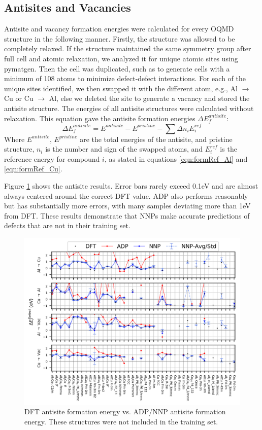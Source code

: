 \documentclass{article}
\begin{document}
\subsection{Antisites and Vacancies} \label{sct:antsite_results}
Antisite and vacancy formation energies were calculated for every OQMD structure in the following manner.
Firstly, the structure was allowed to be completely relaxed.
If the structure maintained the same symmetry group after full cell and atomic relaxation, we analyzed it for unique atomic sites using pymatgen.
Then the cell was duplicated, such as to generate cells with a minimum of 108 atoms to minimize defect-defect interactions.
For each of the unique sites identified, we then swapped it with the different atom, e.g., Al $\rightarrow$ Cu or Cu $\rightarrow$ Al, else we deleted the site to generate a vacancy and stored the antisite structure.
The energies of all antisite structures were calculated without relaxation.
This equation gave the antisite formation energies $\Delta E^{antisite}_f$:
\begin{equation}
\Delta E^{antisite}_f = E^{antisite} - E^{pristine} - \sum\Delta n_i E^{ref}_i
\end{equation}
Where $E^{antisite}$, $E^{pristine}$ are the total energies of the antisite, and pristine structure, $n_i$ is the 
number and sign of the swapped atoms, and $E^{ref}_i$ is the reference energy for compound $i$, as stated in 
equations \ref{eqn:formRef_Al} and \ref{eqn:formRef_Cu}.

Figure \ref{fig:antisite_plot} shows the antisite results.
Error bars rarely exceed 0.1eV and are almost always centered around the correct DFT value.
ADP also performs reasonably but has substantially more errors, with many samples deviating more than 1eV from DFT.
These results demonstrate that NNPs make accurate predictions of defects that are not in their training set. 

\begin{figure}[H]%
\centering%
\includegraphics[width=1\textwidth,center]{figures/antisite_vacancies.png}%
\caption{DFT antisite formation energy vs. ADP/NNP antisite formation energy.
These structures were not included in the training set.}%
\label{fig:antisite_plot}
\end{figure}
\end{document}
